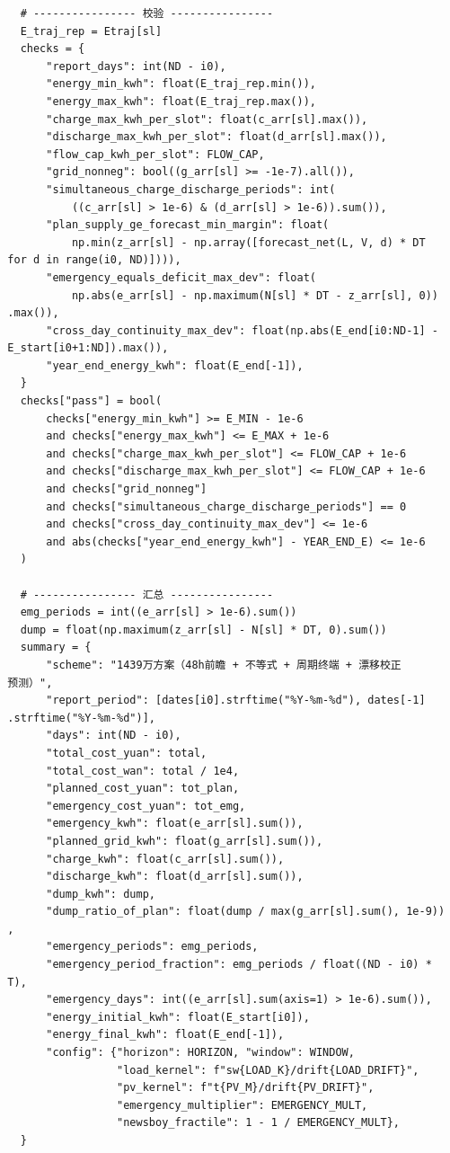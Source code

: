 \begin{verbatim}
    # ---------------- 校验 ----------------
    E_traj_rep = Etraj[sl]
    checks = {
        "report_days": int(ND - i0),
        "energy_min_kwh": float(E_traj_rep.min()),
        "energy_max_kwh": float(E_traj_rep.max()),
        "charge_max_kwh_per_slot": float(c_arr[sl].max()),
        "discharge_max_kwh_per_slot": float(d_arr[sl].max()),
        "flow_cap_kwh_per_slot": FLOW_CAP,
        "grid_nonneg": bool((g_arr[sl] >= -1e-7).all()),
        "simultaneous_charge_discharge_periods": int(
            ((c_arr[sl] > 1e-6) & (d_arr[sl] > 1e-6)).sum()),
        "plan_supply_ge_forecast_min_margin": float(
            np.min(z_arr[sl] - np.array([forecast_net(L, V, d) * DT
  for d in range(i0, ND)]))),
        "emergency_equals_deficit_max_dev": float(
            np.abs(e_arr[sl] - np.maximum(N[sl] * DT - z_arr[sl], 0))
  .max()),
        "cross_day_continuity_max_dev": float(np.abs(E_end[i0:ND-1] -
  E_start[i0+1:ND]).max()),
        "year_end_energy_kwh": float(E_end[-1]),
    }
    checks["pass"] = bool(
        checks["energy_min_kwh"] >= E_MIN - 1e-6
        and checks["energy_max_kwh"] <= E_MAX + 1e-6
        and checks["charge_max_kwh_per_slot"] <= FLOW_CAP + 1e-6
        and checks["discharge_max_kwh_per_slot"] <= FLOW_CAP + 1e-6
        and checks["grid_nonneg"]
        and checks["simultaneous_charge_discharge_periods"] == 0
        and checks["cross_day_continuity_max_dev"] <= 1e-6
        and abs(checks["year_end_energy_kwh"] - YEAR_END_E) <= 1e-6
    )

    # ---------------- 汇总 ----------------
    emg_periods = int((e_arr[sl] > 1e-6).sum())
    dump = float(np.maximum(z_arr[sl] - N[sl] * DT, 0).sum())
    summary = {
        "scheme": "1439万方案（48h前瞻 + 不等式 + 周期终端 + 漂移校正
  预测）",
        "report_period": [dates[i0].strftime("%Y-%m-%d"), dates[-1]
  .strftime("%Y-%m-%d")],
        "days": int(ND - i0),
        "total_cost_yuan": total,
        "total_cost_wan": total / 1e4,
        "planned_cost_yuan": tot_plan,
        "emergency_cost_yuan": tot_emg,
        "emergency_kwh": float(e_arr[sl].sum()),
        "planned_grid_kwh": float(g_arr[sl].sum()),
        "charge_kwh": float(c_arr[sl].sum()),
        "discharge_kwh": float(d_arr[sl].sum()),
        "dump_kwh": dump,
        "dump_ratio_of_plan": float(dump / max(g_arr[sl].sum(), 1e-9))
  ,
        "emergency_periods": emg_periods,
        "emergency_period_fraction": emg_periods / float((ND - i0) *
  T),
        "emergency_days": int((e_arr[sl].sum(axis=1) > 1e-6).sum()),
        "energy_initial_kwh": float(E_start[i0]),
        "energy_final_kwh": float(E_end[-1]),
        "config": {"horizon": HORIZON, "window": WINDOW,
                   "load_kernel": f"sw{LOAD_K}/drift{LOAD_DRIFT}",
                   "pv_kernel": f"t{PV_M}/drift{PV_DRIFT}",
                   "emergency_multiplier": EMERGENCY_MULT,
                   "newsboy_fractile": 1 - 1 / EMERGENCY_MULT},
    }


\end{verbatim}
